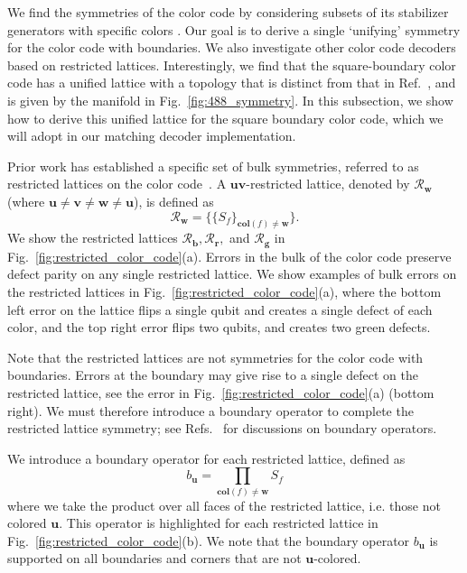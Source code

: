 \documentclass[a4paper,twocolumn,11pt,accepted=2024-12-23]{quantumarticle}
\begin{document}
We find the symmetries of the color code by considering subsets of its stabilizer generators with specific colors \cite{delfosse2014decoding,sahay2022decoder}. %
Our goal is to derive a single `unifying' symmetry for the color code with boundaries. We also investigate other color code decoders based on restricted lattices. Interestingly, we find that the square-boundary color code has a unified lattice with a topology that is distinct from that in Ref.~\cite{sahay2022decoder}, and is given by the manifold in Fig.~\ref{fig:488_symmetry}. In this subsection, we show how to derive this unified lattice for the square boundary color code, which we will adopt in our matching decoder implementation.


Prior work has established a specific set of bulk symmetries, referred to as restricted lattices on the color code~\cite{delfosse2014decoding}. 
A $\mathbf{uv}$-restricted lattice, denoted by $\mathcal{R}_\mathbf{w}$ (where $\textbf{u} \neq \textbf{v} \neq \textbf{w} \neq \textbf{u}$), is defined as
\begin{equation}
    \mathcal{R}_{\mathbf{w}} = \{ \{S_f \} _{\mathbf{col}(f) \neq \mathbf{w} } \}.
\end{equation}
We show the restricted lattices $\mathcal{R}_\mathbf{b}, \mathcal{R}_\mathbf{r},$ and $ \mathcal{R}_\mathbf{g}$ in Fig.~\ref{fig:restricted_color_code}(a). Errors in the bulk of the color code preserve defect parity on any single restricted lattice. We show examples of bulk errors on the restricted lattices in Fig.~\ref{fig:restricted_color_code}(a), where the bottom left error on the lattice flips a single qubit and creates a single defect of each color, and the top right error flips two qubits, and creates two green defects.


Note that the restricted lattices are not symmetries for the color code with boundaries. Errors at the boundary may give rise to a single defect on the restricted lattice, see the error in Fig.~\ref{fig:restricted_color_code}(a) (bottom right). We must therefore introduce a boundary operator to complete the restricted lattice symmetry; see Refs.~\cite{sahay2022decoder, brown2022conservation} for discussions on boundary operators. 


We introduce a boundary operator for each restricted lattice, defined as
\begin{equation}
    b_{\mathbf{u}} = \prod_{\mathbf{col}(f) \neq \mathbf{w} } S_f
\end{equation}
where we take the product over all faces of the restricted lattice, i.e. those not colored $\mathbf{u}$. This operator is highlighted for each restricted lattice in Fig.~\ref{fig:restricted_color_code}(b). We note that the boundary operator $b_{\mathbf{u}}$ is supported on all boundaries and corners that are not $\mathbf{u}$-colored.
\end{document}
